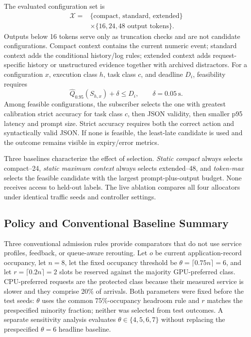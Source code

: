 \documentclass[journal]{IEEEtran}
\begin{document}
The evaluated configuration set is
\begin{equation}
\begin{split}
 \mathcal X={}&\{\text{compact, standard, extended}\}\\
 &\times\{16,24,48\text{ output tokens}\}.
\end{split}
\end{equation}
Outputs below 16 tokens serve only as truncation checks and are not candidate configurations. Compact context contains the current numeric event; standard context adds the conditional history/log rules; extended context adds request-specific history or unstructured evidence together with archived distractors. For a configuration $x$, execution class $h$, task class $c$, and deadline $D_i$, feasibility requires
\begin{equation}
 \widehat Q_{0.95}(S_{h,x})+\delta\le D_i,\qquad \delta=0.05\ \mathrm{s}.
\end{equation}
Among feasible configurations, the subscriber selects the one with greatest calibration strict accuracy for task class $c$, then JSON validity, then smaller p95 latency and prompt size. Strict accuracy requires both the correct action and syntactically valid JSON. If none is feasible, the least-late candidate is used and the outcome remains visible in expiry/error metrics.

Three baselines characterize the effect of selection. \emph{Static compact} always selects compact--24, \emph{static maximum context} always selects extended--48, and \emph{token-max} selects the feasible candidate with the largest prompt-plus-output budget. None receives access to held-out labels. The live ablation compares all four allocators under identical traffic seeds and controller settings.

\subsection{Policy and Conventional Baseline Summary}

Three conventional admission rules provide comparators that do not use service profiles, feedback, or queue-aware rerouting. Let $o$ be current application-record occupancy, let $n=8$, let the fixed occupancy threshold be $\theta=\lceil0.75n\rceil=6$, and let $r=\lceil0.2n\rceil=2$ slots be reserved against the majority GPU-preferred class. CPU-preferred requests are the protected class because their measured service is slower and they comprise 20\% of arrivals. Both parameters were fixed before the test seeds: $\theta$ uses the common 75\%-occupancy headroom rule and $r$ matches the prespecified minority fraction; neither was selected from test outcomes. A separate sensitivity analysis evaluates $\theta\in\{4,5,6,7\}$ without replacing the prespecified $\theta=6$ headline baseline.
\end{document}
